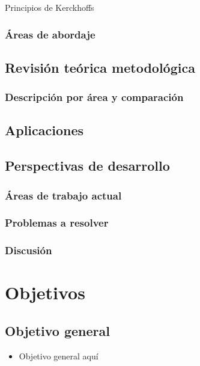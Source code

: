 			
			Principios de Kerckhoffs			
			
		
			\subsubsection{Áreas de abordaje}
	

		\subsection{Revisión teórica metodológica}
			\subsubsection{Descripción por área y comparación}

		\subsection{Aplicaciones}
		
		\subsection{Perspectivas de desarrollo}
			\subsubsection{Áreas de trabajo actual}
			\subsubsection{Problemas a resolver}
			\subsubsection{Discusión}


	
	\section{Objetivos}
	
		\subsection{Objetivo general}
			\begin{itemize}
				\item Objetivo general aquí
			\end{itemize}
		
